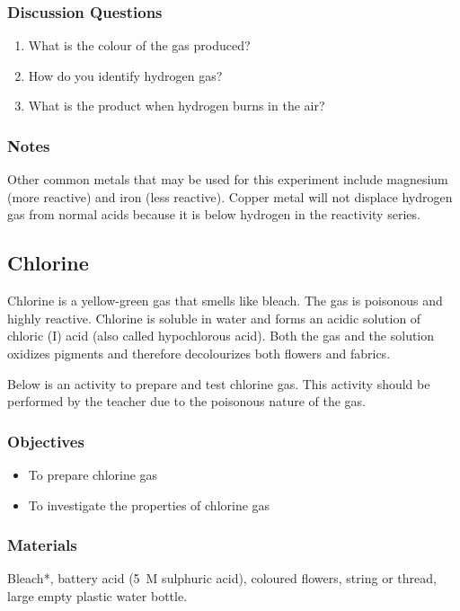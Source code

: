 \subsubsection*{Discussion Questions}
\begin{enumerate}
\item{What is the colour of the gas produced?}
\item{How do you identify hydrogen gas?}
\item{What is the product when hydrogen burns in the air?}
\end{enumerate}

\subsubsection*{Notes}
Other common metals that may be used for this experiment include magnesium (more reactive) and iron (less reactive). Copper metal will not displace hydrogen gas from normal acids because it is below hydrogen in the reactivity series.

\subsection{Chlorine}

Chlorine is a yellow-green gas that smells like bleach. The gas is poisonous and highly reactive. Chlorine is soluble in water and forms an acidic solution of chloric (I) acid (also called hypochlorous acid). Both the gas and the solution oxidizes pigments and therefore decolourizes both flowers and fabrics.

Below is an activity to prepare and test chlorine gas. This activity should be performed by the teacher due to the poisonous nature of the gas.

\subsubsection*{Objectives}
\begin{itemize}
\item{To prepare chlorine gas}
\item{To investigate the properties of chlorine gas}
\end{itemize}

\subsubsection*{Materials}
Bleach*, battery acid (5~M sulphuric acid), coloured flowers, string or thread, large empty plastic water bottle.

